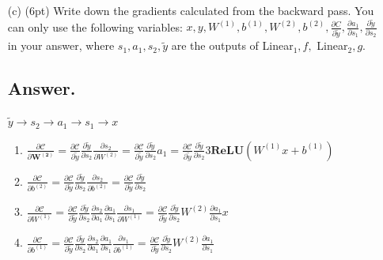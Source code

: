 \documentclass{article}
\begin{document}
\begin{itemize}
    
    \item[(c)] (6pt) Write down the gradients calculated from the backward pass. You can only use the following variables: $x, y, W^{(1)}, b^{(1)}, W^{(2)}, b^{(2)}, \frac{\partial C}{\partial \tilde{y}}, \frac{\partial a_1}{\partial s_1}, \frac{\partial \tilde{y}}{\partial s_2}$ in your answer, where $s_1, a_1, s_2, \tilde{y}$ are the outputs of Linear$_1, f, $ Linear$_2, g$.
    
    
     \subsection*{Answer.}
      $\tilde{y} \rightarrow s_2 \rightarrow a_1 \rightarrow s_1 \rightarrow x$
     \begin{enumerate} 
     \item \(\frac{\partial \mathcal{C}}{\partial \boldsymbol{{W^{(2)}}}} = \frac{\partial \mathcal{C}}{\partial \tilde{y}} \frac{\partial \tilde{y}}{\partial s_{2}} \frac{\partial s_{2}}{\partial W^{(2)}} = \frac{\partial \mathcal{C}}{\partial \tilde{y}} \frac{\partial \tilde{y}}{\partial s_{2}} a_1 
     =\frac{\partial \mathcal{C}}{\partial \tilde{y}} \frac{\partial \tilde{y}}{\partial s_{2}}3\textbf{ReLU}(W^{(1)}x + b^{(1)})  \)
    \item \(\frac{\partial \mathcal{C}}{\partial b^{(2)}} = \frac{\partial \mathcal{C}}{\partial \tilde{y}} \frac{\partial \tilde{y}}{\partial s_{2}} \frac{\partial s_{2}}{\partial b^{(2)}} = \frac{\partial \mathcal{C}}{\partial \tilde{y}} \frac{\partial \tilde{y}}{\partial s_{2}}\)
    \item \(\frac{\partial \mathcal{C}}{\partial W^{(1)}} = \frac{\partial \mathcal{C}}{\partial \tilde{y}} \frac{\partial \tilde{y}}{\partial s_{2}} \frac{\partial s_{2}}{\partial a_{1}} \frac{\partial a_{1}}{\partial s_{1}} \frac{\partial s_{1}}{\partial W^{(1)}} =  \frac{\partial \mathcal{C}}{\partial \tilde{y}} \frac{\partial \tilde{y}}{\partial s_{2}} W^{(2)} \frac{\partial a_{1}}{\partial s_{1}} x \)
    
    \item \(\frac{\partial \mathcal{C}}{\partial b^{(1)}} = \frac{\partial \mathcal{C}}{\partial \tilde{y}} \frac{\partial \tilde{y}}{\partial s_{2}} \frac{\partial s_{2}}{\partial a_{1}} \frac{\partial a_{1}}{\partial s_{1}} \frac{\partial s_{1}}{\partial b^{(1)}} = \frac{\partial \mathcal{C}}{\partial \tilde{y}} \frac{\partial \tilde{y}}{\partial s_{2}} W^{(2)} \frac{\partial a_1}{\partial s_{1}} \)
     \end{enumerate}
    


\end{itemize}
\end{document}
